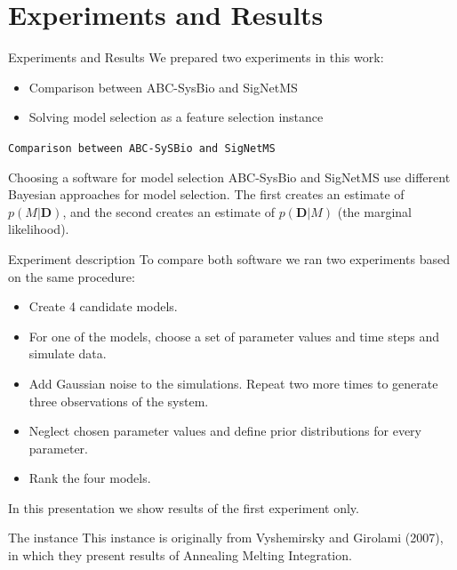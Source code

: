 \documentclass{beamer}
\begin{document}
\section{Experiments and Results}
\begin{frame}{Experiments and Results}
We prepared two experiments in this work: \pause
    \begin{itemize}
        \item{Comparison between ABC-SysBio and SigNetMS}
        \item{Solving model selection as a feature selection instance}
    \end{itemize}
\end{frame}

\begin{frame}{}
\begin{center}
    \texttt{Comparison between ABC-SySBio and SigNetMS}
\end{center}
\end{frame}

\begin{frame}{Choosing a software for model selection}
ABC-SysBio and SigNetMS use different Bayesian approaches for model
selection. \pause The first creates an estimate of $p(M|{\bm D})$, 
\pause and the second creates an estimate of $p({\bm D}|M)$ (the
marginal likelihood).
\end{frame}

\begin{frame}{Experiment description}
To compare both software we ran two experiments based on the same 
procedure:
\begin{itemize}
    \pause
    \item{Create 4 candidate models.}
    \pause
    \item{For one of the models, choose a set of parameter values 
        and time steps and simulate data.}
    \pause
    \item{Add Gaussian noise to the simulations. Repeat two more 
        times to generate three observations of the system.}
    \pause
    \item{Neglect chosen parameter values and define prior distributions
        for every parameter.}
    \pause
    \item{Rank the four models.}
\end{itemize}
\pause In this presentation we show results of the first experiment
only.
\end{frame}

\begin{frame}{The instance}
This instance is originally from Vyshemirsky and Girolami (2007), in 
which they present results of Annealing Melting Integration. 
\end{frame}
\end{document}
